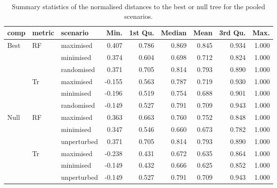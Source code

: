 \begin{table}[ht]
\centering
\begin{tabular}{lllrrrrrr}
  \hline
comp & metric & scenario & Min. & 1st Qu. & Median & Mean & 3rd Qu. & Max. \\ 
  \hline
Best & RF & maximised & 0.407 & 0.786 & 0.869 & 0.845 & 0.934 & 1.000 \\ 
   &  & minimised & 0.374 & 0.604 & 0.698 & 0.712 & 0.824 & 1.000 \\ 
   &  & randomised & 0.371 & 0.705 & 0.814 & 0.793 & 0.890 & 1.000 \\ 
   & Tr & maximised & -0.155 & 0.563 & 0.787 & 0.719 & 0.930 & 1.000 \\ 
   &  & minimised & -0.196 & 0.519 & 0.754 & 0.688 & 0.901 & 1.000 \\ 
   &  & randomised & -0.149 & 0.527 & 0.791 & 0.709 & 0.943 & 1.000 \\ 
  Null & RF & maximised & 0.363 & 0.663 & 0.760 & 0.752 & 0.848 & 1.000 \\ 
   &  & minimised & 0.347 & 0.546 & 0.660 & 0.673 & 0.782 & 1.000 \\ 
   &  & unperturbed & 0.371 & 0.705 & 0.814 & 0.793 & 0.890 & 1.000 \\ 
   & Tr & maximised & -0.238 & 0.431 & 0.672 & 0.635 & 0.864 & 1.000 \\ 
   &  & minimised & -0.149 & 0.432 & 0.666 & 0.625 & 0.852 & 1.000 \\ 
   &  & unperturbed & -0.149 & 0.527 & 0.791 & 0.709 & 0.943 & 1.000 \\ 
   \hline
\end{tabular}
\caption{Summary statistics of the normalised distances to the best or null tree for the pooled scenarios.} 
\label{Full_Tab_pooledscenarios}
\end{table}
